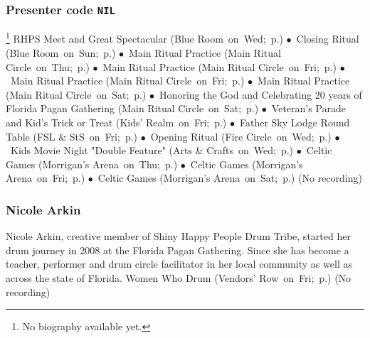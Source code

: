 \vspace{6pt}

\subsubsection{\textbf{Presenter code \texttt{NIL}}} %
{  \small  \footnote{No biography available yet.} } %
\hspace{2em} {\footnotesize RHPS Meet and Great Spectacular (Blue Room~on~Wed;~p.\pageref{Wed-Meet-Greet}) $\bullet$~Closing Ritual (Blue Room~on~Sun;~p.\pageref{Sun-CLOSING}) $\bullet$~Main Ritual Practice (Main Ritual Circle~on~Thu;~p.\pageref{Thu-Prac1}) $\bullet$~Main Ritual Practice (Main Ritual Circle~on~Fri;~p.\pageref{Fri-Prac2}) $\bullet$~Main Ritual Practice (Main Ritual Circle~on~Fri;~p.\pageref{Fri-Prac3}) $\bullet$~Main Ritual Practice (Main Ritual Circle~on~Sat;~p.\pageref{Sat-Prac4}) $\bullet$~Honoring the God and Celebrating 20 years of Florida Pagan Gathering (Main Ritual Circle~on~Sat;~p.\pageref{Sat-RITUAL}) $\bullet$~Veteran's Parade and Kid's Trick or Treat (Kids' Realm~on~Fri;~p.\pageref{Fri-Parade}) $\bullet$~Father Sky Lodge Round Table (FSL \& StS~on~Fri;~p.\pageref{Fri-Sage1}) $\bullet$~Opening Ritual (Fire Circle~on~Wed;~p.\pageref{Wed-OPENING}) $\bullet$~Kids Movie Night "Double Feature" (Arts \& Crafts~on~Wed;~p.\pageref{Wed-kid-Meet}) $\bullet$~Celtic Games (Morrigan's Arena~on~Thu;~p.\pageref{Thu-Celts1}) $\bullet$~Celtic Games (Morrigan's Arena~on~Fri;~p.\pageref{Fri-Celts2}) $\bullet$~Celtic Games (Morrigan's Arena~on~Sat;~p.\pageref{Sat-Celts3})}
 {\small (No recording)} 

\vspace{6pt}

\subsubsection{Nicole Arkin} %
{  \small  Nicole Arkin, creative member of Shiny Happy People Drum Tribe, started her drum journey in 2008 at the Florida Pagan Gathering. Since she has become a teacher, performer and drum circle facilitator in her local community as well as across the state of Florida.  } %
\hspace{2em} {\footnotesize Women Who Drum (Vendors' Row~on~Fri;~p.\pageref{Fri-Arkin1})}
 {\small (No recording)} 

\vspace{6pt}

